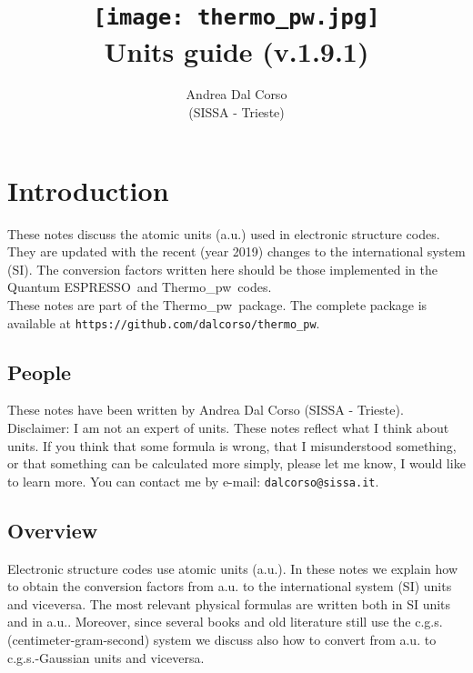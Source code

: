 \documentclass[12pt,a4paper,twoside]{report}
\def\version{1.9.1}
\def\qe{{\sc Quantum ESPRESSO}}
\def\tpw{{\sc Thermo}\_{\sc pw}}
\begin{document}
 

\author{Andrea Dal Corso \\ (SISSA - Trieste)}
\date{}

\title{
  \texttt{[image: thermo\_pw.jpg]} \\
  \vspace{3truecm}
  \Huge \color{dark-blue} Units guide (v.\version)
}

\maketitle

\newpage

\color{dark-blue}
\tableofcontents
\color{black}

\newpage

{\color{dark-blue}\chapter{Introduction}}
\color{black}

These notes discuss the atomic units (a.u.) used in 
electronic structure codes. They are updated with the recent 
(year 2019) changes to the international system (SI).  
The conversion factors written here should be those implemented in
the \qe\ and \tpw\ codes. \\
These notes are part of the \tpw\ package. The complete package is
available at \texttt{https://github.com/dalcorso/thermo\_pw}.

\newpage
{\color{coral}\section{People}}
\color{black}
These notes have been written by Andrea Dal Corso (SISSA - Trieste). \\
Disclaimer: I am not an expert of units. 
These notes reflect what I think about units.
If you think that some formula is wrong, that I misunderstood something, or 
that something can be calculated more simply, please let me know, I would 
like to learn more. 
You can contact me by e-mail: \texttt{dalcorso@sissa.it}. 

\newpage
{\color{coral}\section{Overview}}
\color{black}
Electronic structure codes use atomic units (a.u.). 
In these notes we explain how to obtain the conversion factors 
from a.u. to the international system (SI) units and viceversa. 
The most relevant physical formulas are written both in SI units 
and in a.u.. Moreover, since several books and old literature still 
use the c.g.s. (centimeter-gram-second) system we discuss also how 
to convert from a.u. to c.g.s.-Gaussian units and viceversa.
\end{document}
